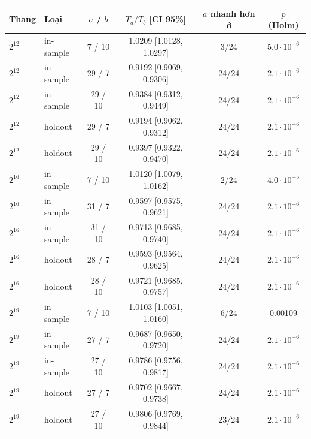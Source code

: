 \begin{tabular}{llcccc}
\toprule
Thang & Loại & $a$ / $b$ & $T_a/T_b$ [CI 95\%] & $a$ nhanh hơn ở & $p$ (Holm) \\
\midrule
$2^{12}$ & in-sample & 7 / 10 & 1.0209 [1.0128, 1.0297] & 3/24 & $5.0\cdot10^{-6}$ \\
$2^{12}$ & in-sample & 29 / 7 & 0.9192 [0.9069, 0.9306] & 24/24 & $2.1\cdot10^{-6}$ \\
$2^{12}$ & in-sample & 29 / 10 & 0.9384 [0.9312, 0.9449] & 24/24 & $2.1\cdot10^{-6}$ \\
$2^{12}$ & holdout & 29 / 7 & 0.9194 [0.9062, 0.9312] & 24/24 & $2.1\cdot10^{-6}$ \\
$2^{12}$ & holdout & 29 / 10 & 0.9397 [0.9322, 0.9470] & 24/24 & $2.1\cdot10^{-6}$ \\
$2^{16}$ & in-sample & 7 / 10 & 1.0120 [1.0079, 1.0162] & 2/24 & $4.0\cdot10^{-5}$ \\
$2^{16}$ & in-sample & 31 / 7 & 0.9597 [0.9575, 0.9621] & 24/24 & $2.1\cdot10^{-6}$ \\
$2^{16}$ & in-sample & 31 / 10 & 0.9713 [0.9685, 0.9740] & 24/24 & $2.1\cdot10^{-6}$ \\
$2^{16}$ & holdout & 28 / 7 & 0.9593 [0.9564, 0.9625] & 24/24 & $2.1\cdot10^{-6}$ \\
$2^{16}$ & holdout & 28 / 10 & 0.9721 [0.9685, 0.9757] & 24/24 & $2.1\cdot10^{-6}$ \\
$2^{19}$ & in-sample & 7 / 10 & 1.0103 [1.0051, 1.0160] & 6/24 & 0.00109 \\
$2^{19}$ & in-sample & 27 / 7 & 0.9687 [0.9650, 0.9720] & 24/24 & $2.1\cdot10^{-6}$ \\
$2^{19}$ & in-sample & 27 / 10 & 0.9786 [0.9756, 0.9817] & 24/24 & $2.1\cdot10^{-6}$ \\
$2^{19}$ & holdout & 27 / 7 & 0.9702 [0.9667, 0.9738] & 24/24 & $2.1\cdot10^{-6}$ \\
$2^{19}$ & holdout & 27 / 10 & 0.9806 [0.9769, 0.9844] & 23/24 & $2.1\cdot10^{-6}$ \\
\bottomrule
\end{tabular}
